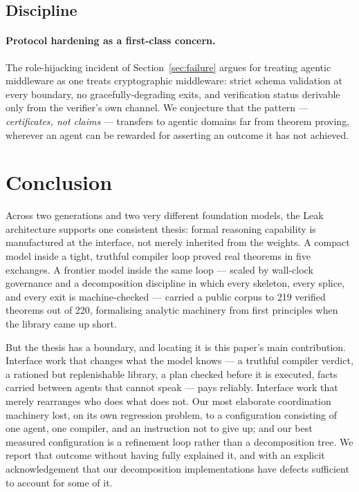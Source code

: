 \documentclass[12pt, a4paper]{article}
\begin{document}
\subsection{Discipline}

\paragraph{Protocol hardening as a first-class concern.} The role-hijacking
incident of Section~\ref{sec:failure} argues for treating agentic middleware
as one treats cryptographic middleware: strict schema validation at every
boundary, no gracefully-degrading exits, and verification status derivable
only from the verifier's own channel. We conjecture that the pattern ---
\emph{certificates, not claims} --- transfers to agentic domains far from
theorem proving, wherever an agent can be rewarded for asserting an outcome
it has not achieved.

\section{Conclusion}

Across two generations and two very different foundation models, the Leak
architecture supports one consistent thesis: formal reasoning capability is
manufactured at the interface, not merely inherited from the weights. A
compact model inside a tight, truthful compiler loop proved real theorems
in five exchanges. A frontier model inside the same loop --- scaled by
wall-clock governance and a decomposition discipline in which every
skeleton, every splice, and every exit is machine-checked --- carried a
public corpus to 219 verified theorems out of 220, formalising analytic
machinery from first principles when the library came up short.

But the thesis has a boundary, and locating it is this paper's main
contribution. Interface work that changes what the model knows --- a truthful
compiler verdict, a rationed but replenishable library, a plan checked before
it is executed, facts carried between agents that cannot speak --- pays
reliably. Interface work that merely rearranges who does what does not. Our
most elaborate coordination machinery lost, on its own regression problem,
to a configuration consisting of one agent, one compiler, and an instruction
not to give up; and our best measured configuration is a refinement loop
rather than a decomposition tree. We report that outcome without having
fully explained it, and with an explicit acknowledgement that our
decomposition implementations have defects sufficient to account for some of
it.
\end{document}
